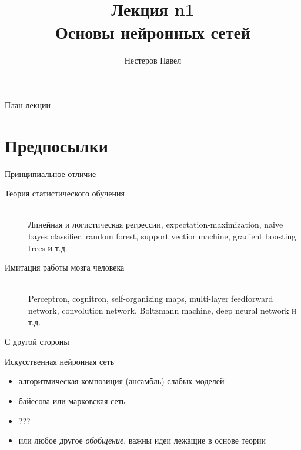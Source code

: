 \documentclass[10pt]{beamer}
\author{Нестеров Павел}
\title{\newline \newline \newline Лекция n1 \\ Основы нейронных сетей}
\let\otp\titlepage
\renewcommand{\titlepage}{\otp\addtocounter{framenumber}{-1}}
\begin{document}
\begin{frame}[plain]
\titlepage
\end{frame}

\begin{frame}{План лекции}
\tableofcontents
\end{frame}


\section{Предпосылки}

\begin{frame}{Принципиальное отличие}

\begin{description}
  \item[Теория статистического обучения] \hfill \\
  Линейная и логистическая регрессии, expectation-maximization, naive bayes classifier, random forest, support vectior machine, gradient boosting trees и т.д.
  \item[Имитация работы мозга человека] \hfill \\
  Perceptron, cognitron, self-organizing maps, multi-layer feedforward network, convolution network, Boltzmann machine, deep neural network и т.д. \\
\end{description}

\end{frame}


\begin{frame}{С другой стороны}

\begin{block}{Искусственная нейронная сеть}
\begin{itemize}
  \item алгоритмическая композиция (ансамбль) слабых моделей
  \item байесова или марковская сеть
  \item ???
  \item или любое другое \textit{обобщение}, важны идеи лежащие в основе теории
\end{itemize}
\end{block}

\end{frame}
\end{document}

